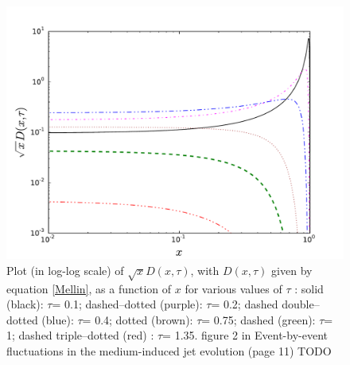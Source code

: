 \documentclass[a4paper,12pt]{article}
\numberwithin{equation}{section}
\begin{document}
\begin{figure}
\begin{center}
\includegraphics[width=0.8\linewidth]{plot_D1.pdf}
\end{center}
\vspace*{-30pt}
\caption{Plot (in log-log scale) of $\sqrt{x}D(x,\tau)$, with $D(x,\tau)$ given by equation \eqref{Mellin}, as a function of
$x$ for various
values of $\tau$
:  solid (black):
$\tau$= 0.1; dashed–dotted (purple):
$\tau$= 0.2; dashed double–dotted (blue):
$\tau$= 0.4;
dotted (brown):
$\tau$= 0.75; dashed (green):
$\tau$= 1; dashed triple–dotted (red) :
$\tau$= 1.35.
  figure 2 in Event-by-event fluctuations in the medium-induced jet evolution (page 11) TODO}\label{Dfig}
\end{figure}
\end{document}
